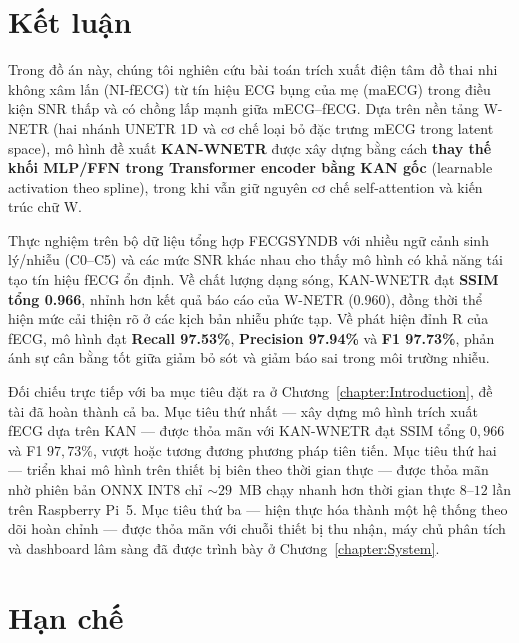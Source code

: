 \documentclass[../DoAn.tex]{subfiles}
\begin{document}

\section{Kết luận}

Trong đồ án này, chúng tôi nghiên cứu bài toán trích xuất điện tâm đồ thai nhi không xâm lấn (NI-fECG) từ tín hiệu ECG bụng của mẹ (maECG) trong điều kiện SNR thấp và có chồng lấp mạnh giữa mECG–fECG. Dựa trên nền tảng W-NETR (hai nhánh UNETR 1D và cơ chế loại bỏ đặc trưng mECG trong latent space), mô hình đề xuất \textbf{KAN-WNETR} được xây dựng bằng cách \textbf{thay thế khối MLP/FFN trong Transformer encoder bằng KAN gốc} (learnable activation theo spline), trong khi vẫn giữ nguyên cơ chế self-attention và kiến trúc chữ W.

Thực nghiệm trên bộ dữ liệu tổng hợp FECGSYNDB với nhiều ngữ cảnh sinh lý/nhiễu (C0--C5) và các mức SNR khác nhau cho thấy mô hình có khả năng tái tạo tín hiệu fECG ổn định. Về chất lượng dạng sóng, KAN-WNETR đạt \textbf{SSIM tổng 0.966}, nhỉnh hơn kết quả báo cáo của W-NETR (0.960), đồng thời thể hiện mức cải thiện rõ ở các kịch bản nhiễu phức tạp. Về phát hiện đỉnh R của fECG, mô hình đạt \textbf{Recall 97.53\%}, \textbf{Precision 97.94\%} và \textbf{F1 97.73\%}, phản ánh sự cân bằng tốt giữa giảm bỏ sót và giảm báo sai trong môi trường nhiễu.

Đối chiếu trực tiếp với ba mục tiêu đặt ra ở Chương~\ref{chapter:Introduction}, đề tài đã hoàn thành cả ba. Mục tiêu thứ nhất --- xây dựng mô hình trích xuất fECG dựa trên KAN --- được thỏa mãn với KAN-WNETR đạt SSIM tổng $0{,}966$ và F1 $97{,}73\%$, vượt hoặc tương đương phương pháp tiên tiến. Mục tiêu thứ hai --- triển khai mô hình trên thiết bị biên theo thời gian thực --- được thỏa mãn nhờ phiên bản ONNX INT8 chỉ $\sim$$29$~MB chạy nhanh hơn thời gian thực $8$--$12$ lần trên Raspberry Pi~5. Mục tiêu thứ ba --- hiện thực hóa thành một hệ thống theo dõi hoàn chỉnh --- được thỏa mãn với chuỗi thiết bị thu nhận, máy chủ phân tích và dashboard lâm sàng đã được trình bày ở Chương~\ref{chapter:System}.

\section{Hạn chế}
\end{document}
